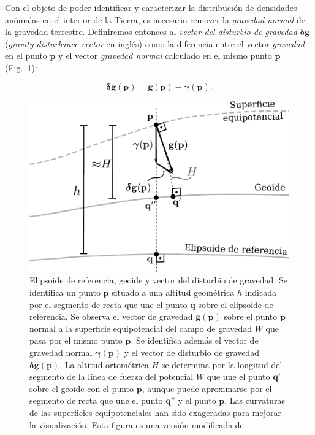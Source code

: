 Con el objeto de poder identificar y caracterizar la distribución de densidades
anómalas en el interior de la Tierra, es necesario remover la \emph{gravedad
normal} de la gravedad terrestre.
Definiremos entonces al \emph{vector del disturbio de gravedad}
$\boldsymbol\delta \mathbf{g}$ (\emph{gravity disturbance vector} en inglés)
como la diferencia entre el vector \emph{gravedad} en el punto $\mathbf{p}$
y el vector \emph{gravedad normal} calculado en el mismo punto $\mathbf{p}$
(Fig.~\ref{fig:superficies-equipotenciales}):

\begin{equation}
    \boldsymbol\delta \mathbf{g}(\mathbf{p}) =
        \mathbf{g}(\mathbf{p}) - \boldsymbol\gamma(\mathbf{p}).
    \label{eq:gravity-disturbance-vector}
\end{equation}

\begin{figure}[t!]
    \centering
    \includegraphics[width=\linewidth]{figs/surfaces.pdf}
    \caption{
        Elipsoide de referencia, geoide y vector del disturbio de gravedad.
        Se identifica un punto $\mathbf{p}$ situado a una altitud geométrica
        $h$ indicada por el segmento de recta que une el punto $\mathbf{q}$
        sobre el elipsoide de referencia.
        Se observa el vector de gravedad $\mathbf{g}(\mathbf{p})$ sobre el
        punto $\mathbf{p}$ normal a la superficie equipotencial del campo de
        gravedad $W$ que pasa por el mismo punto $\mathbf{p}$.
        Se identifica además el vector de gravedad normal
        $\boldsymbol\gamma(\mathbf{p})$ y el vector de disturbio de gravedad
        $\boldsymbol\delta \mathbf{g}(\mathbf{p})$.
        La altitud ortométrica $H$ se determina por la longitud del segmento de
        la línea de fuerza del potencial $W$ que une el punto $\mathbf{q'}$
        sobre el geoide con el punto $\mathbf{p}$, aunque puede aproximarse por
        el segmento de recta que une el punto $\mathbf{q''}$ y el punto
        $\mathbf{p}$.
        Las curvaturas de las superficies equipotenciales han sido exageradas
        para mejorar la visualización.
        Esta figura es una versión modificada de \citet{oliveira2021b}.
    }
    \label{fig:superficies-equipotenciales}
\end{figure}


